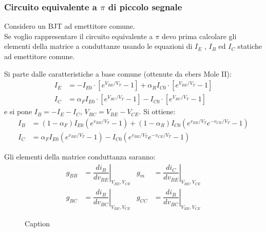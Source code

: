 \subsubsection{Circuito equivalente a $\pi$ di piccolo segnale }
%
Considero un BJT ad emettitore comune.\\
Se voglio rappresentare il circuito equivalente a $\pi$ devo prima calcolare gli elementi della matrice a conduttanze usando le equazioni di $I_E$ , $I_B$ ed $I_C$  statiche ad emettitore comune.
%
\begin{exbox}
    Si parte dalle caratteristiche a base comune (ottenute da ebers Mole II):
    \begin{align}
    I_E &= - I_{E0}  \cdot \left[ e^{V_{BE}/V_T} -1 \right] +\alpha_R I_{C0} \cdot \left[ e^{V_{BE}/V_T} -1 \right]\\
    I_C &=  \alpha_F I_{E0} \cdot \left[ e^{V_{BC}/V_T} -1 \right] -I_{C0}  \cdot \left[ e^{V_{BC}/V_T} -1 \right] 
\end{align}
%
e si pone $I_B=-I_E-I_C$, $V_{BC}=V_{BE}-V_{CE}$. Si ottiene:
%
\begin{align}
    I_B&=(1-\alpha_F)I_{E0}\left( e^{v_{BE}/V_T}-1\right)+(1-\alpha_R)I_{C0}\left(e^{v_{BE}/V_T}e^{-v_{CE}/V_T} -1\right) \\
     I_C&=\alpha_FI_{E0}\left( e^{v_{BE}/V_T}-1\right)-I_{C0}\left(e^{v_{BE}/V_T}e^{-v_{CE}/V_T} -1\right)
\end{align}
\end{exbox}
%
Gli elementi della matrice conduttanza saranno:
%
\begin{align}
    g_{BB} &= \left.\dfrac{di_B}{dv_{BE}}\right|_{V_{BE},V_{CE}}  &  g_{m} &= \left. \dfrac{di_C}{dv_{BE}}\right|_{V_{BE},V_{CE}} \\
    g_{BC} &= \left. \dfrac{di_B}{dv_{BC}}\right|_{V_{BE},V_{CE}}  & g_{CC} &= \left. \dfrac{di_B}{dv_{BC}}\right|_{V_{BE},V_{CE}} \nonumber
\end{align}
%
\begin{figure}[hbt!]
    \centering
    \caption{Caption}
    \label{fig:enter-label}
\end{figure}
